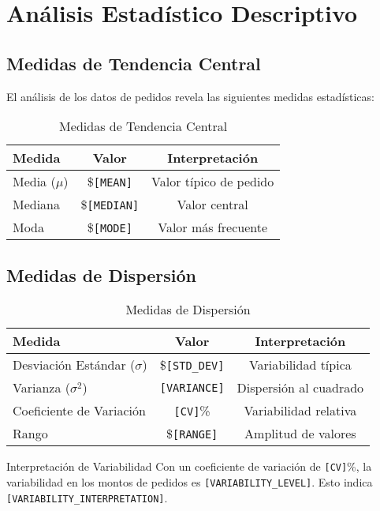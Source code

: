 \documentclass[12pt,a4paper]{article}
\begin{document}
\section{\textcolor{primaryblue}{Análisis Estadístico Descriptivo}}

\subsection{Medidas de Tendencia Central}

El análisis de los datos de pedidos revela las siguientes medidas estadísticas:

\begin{table}[H]
\centering
\begin{tabular}{@{}lcc@{}}
\toprule
\textbf{Medida} & \textbf{Valor} & \textbf{Interpretación} \\
\midrule
Media ($\mu$) & \$\texttt{[MEAN]} & Valor típico de pedido \\
Mediana & \$\texttt{[MEDIAN]} & Valor central \\
Moda & \$\texttt{[MODE]} & Valor más frecuente \\
\bottomrule
\end{tabular}
\caption{Medidas de Tendencia Central}
\label{tab:tendencia}
\end{table}

\subsection{Medidas de Dispersión}

\begin{table}[H]
\centering
\begin{tabular}{@{}lcc@{}}
\toprule
\textbf{Medida} & \textbf{Valor} & \textbf{Interpretación} \\
\midrule
Desviación Estándar ($\sigma$) & \$\texttt{[STD\_DEV]} & Variabilidad típica \\
Varianza ($\sigma^2$) & \texttt{[VARIANCE]} & Dispersión al cuadrado \\
Coeficiente de Variación & \texttt{[CV]}\% & Variabilidad relativa \\
Rango & \$\texttt{[RANGE]} & Amplitud de valores \\
\bottomrule
\end{tabular}
\caption{Medidas de Dispersión}
\label{tab:dispersion}
\end{table}

\begin{infobox}{Interpretación de Variabilidad}
Con un coeficiente de variación de \texttt{[CV]}\%, la variabilidad en los montos de pedidos es \texttt{[VARIABILITY\_LEVEL]}. Esto indica \texttt{[VARIABILITY\_INTERPRETATION]}.
\end{infobox}
\end{document}
